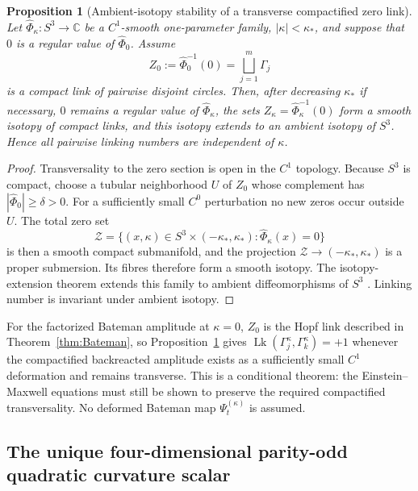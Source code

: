 \documentclass[aps,prd,reprint,nofootinbib,superscriptaddress]{revtex4-2}
\newtheorem{proposition}[theorem]{Proposition}
\theoremstyle{definition}
\theoremstyle{remark}
\begin{document}
\begin{proposition}[Ambient-isotopy stability of a transverse compactified zero link]
\label{prop:TransverseLinkStability}
Let $\widehat\Phi_\kappa:S^3\to\mathbb C$ be a $C^1$-smooth one-parameter family, $|\kappa|<\kappa_*$, and suppose that $0$ is a regular value of $\widehat\Phi_0$. Assume
\begin{equation}
 Z_0:=\widehat\Phi_0^{-1}(0)
 =\bigsqcup_{j=1}^{m}\Gamma_j
\end{equation}
is a compact link of pairwise disjoint circles. Then, after decreasing $\kappa_*$ if necessary, $0$ remains a regular value of $\widehat\Phi_\kappa$, the sets $Z_\kappa=\widehat\Phi_\kappa^{-1}(0)$ form a smooth isotopy of compact links, and this isotopy extends to an ambient isotopy of $S^3$. Hence all pairwise linking numbers are independent of $\kappa$.
\end{proposition}
\begin{proof}
Transversality to the zero section is open in the $C^1$ topology. Because $S^3$ is compact, choose a tubular neighborhood $U$ of $Z_0$ whose complement has $|\widehat\Phi_0|\ge\delta>0$. For a sufficiently small $C^0$ perturbation no new zeros occur outside $U$. The total zero set
\begin{equation}
 \mathcal Z=\{(x,\kappa)\in S^3\times(-\kappa_*,\kappa_*):\widehat\Phi_\kappa(x)=0\}
\end{equation}
is then a smooth compact submanifold, and the projection $\mathcal Z\to(-\kappa_*,\kappa_*)$ is a proper submersion. Its fibres therefore form a smooth isotopy. The isotopy-extension theorem extends this family to ambient diffeomorphisms of $S^3$ \cite{Hirsch1976}. Linking number is invariant under ambient isotopy.
\end{proof}

For the factorized Bateman amplitude at $\kappa=0$, $Z_0$ is the Hopf link described in Theorem~\ref{thm:Bateman}, so Proposition~\ref{prop:TransverseLinkStability} gives $\operatorname{Lk}(\Gamma_j^\kappa,\Gamma_k^\kappa)=+1$ whenever the compactified backreacted amplitude exists as a sufficiently small $C^1$ deformation and remains transverse. This is a conditional theorem: the Einstein--Maxwell equations must still be shown to preserve the required compactified transversality. No deformed Bateman map $\Psi_t^{(\kappa)}$ is assumed.


\subsection{The unique four-dimensional parity-odd quadratic curvature scalar}
\end{document}

